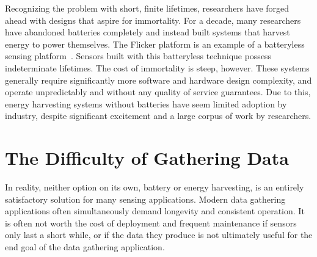 Recognizing the problem with short, finite lifetimes, researchers have forged ahead with designs that aspire for immortality. 
For a decade, many researchers have abandoned batteries completely and instead built systems that harvest energy to power themselves. 
The Flicker platform is an example of a batteryless sensing platform~\cite{hesterFlicker17}. 
Sensors built with this batteryless technique possess indeterminate lifetimes. The cost of immortality is steep, however.
These systems generally require significantly more software and hardware design complexity, and operate unpredictably and without any quality of service guarantees.
Due to this, energy harvesting systems without batteries have seem limited adoption by industry, despite significant excitement and a large corpus of work by researchers. 



\section{The Difficulty of Gathering Data}
In reality, neither option on its own, battery or energy harvesting, is an entirely satisfactory solution for many sensing applications. 
Modern data gathering applications often simultaneously demand longevity and consistent operation.
It is often not worth the cost of deployment and frequent maintenance if sensors only last a short while, or if the data they produce is not ultimately useful for the end goal of the data gathering application.

